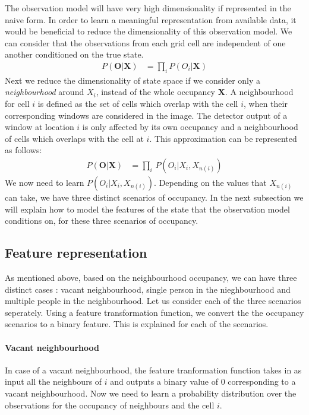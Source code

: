 \documentclass[10pt,twocolumn,letterpaper]{article}
\newcommand{\obs}{\mathbf{O}}
\newcommand{\state}{\mathbf{X}}
\begin{document}
The observation model will have very high dimensionality if represented in the naive form. In order to learn a meaningful representation from available data, it would be beneficial to reduce the dimensionality of this observation model.
We can consider that the observations from each grid cell are independent of one another conditioned on the true state.
\begin{align}
P(\textbf{O}|\textbf{X})&=\prod_{i} {P(O_{i}|\textbf{X})}
\end{align}
Next we reduce the dimensionality of state space if we consider only a \textit{neighbourhood} around $ X_{i} $, instead of the whole occupancy $\textbf{X} $. A neighbourhood for cell $i$ is defined as the set of cells which overlap with the cell $i$, when their corresponding windows are considered in the image. The detector output of a window at location $ i $ is only affected by its own occupancy and a neighbourhood of cells which overlaps with the cell at $ i$. This approximation can be represented as follows: 
\begin{align}
  P(\obs|\state) &= \prod_{i} \, P(O_{i}|X_{i},X_{n(i)})
\end{align}
We now need to learn  $ P(O_{i}|X_{i},X_{n(i)}) $. Depending on the values that $ X_{n(i)} $ can take, we have three distinct scenarios of occupancy. In the next subsection we will explain how to model the features of the state that the observation model conditions on, for these three scenarios of occupancy.

\subsection{Feature representation}

As mentioned above, based on the neighbourhood occupancy, we can have three distinct cases : vacant neighbourhood, single person in the nieghbourhood and multiple people in the neighbourhood. Let us consider each of the three scenarios seperately.
Using a feature transformation function, we convert the the occupancy scenarios to a binary feature. This is explained for each of the scenarios.

\paragraph{Vacant neighbourhood} 
In case of a vacant neighbourhood, the feature tranformation function  takes in as input all the neighbours of $i$ and outputs a binary value of 0 corresponding to a vacant neighbourhood.
Now we need to learn a probability distribution over the observations for the occupancy of neighbours and the cell $i$.
\end{document}
